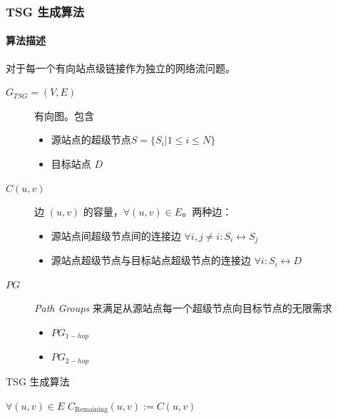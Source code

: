 \begin{frame}
    \frametitle{TSG 生成算法}
    \framesubtitle{算法描述}
    对于每一个有向站点级链接作为独立的网络流问题。
    \begin{description}
        \item[$G_{TSG}=(V,E)$] 有向图。包含
            \begin{itemize}
                \item 源站点的超级节点$S=\{S_i|1\leq i\leq N\}$
                \item 目标站点 $D$
            \end{itemize}
        \item[$C(u,v)$] 边 $(u,v)$ 的容量，$\forall (u,v)\in E$。两种边：
            \begin{itemize}
                \item 源站点间超级节点间的连接边 $\forall i,j\neq i:S_i\leftrightarrow S_j$
                \item 源站点超级节点与目标站点超级节点的连接边 $\forall i: S_i\leftrightarrow D$
            \end{itemize}
        \item[$PG$] \emph{Path Groups} 来满足从源站点每一个超级节点向目标节点的无限需求
            \begin{itemize}
                \item $PG_{1-hop}$
                \item $PG_{2-hop}$
            \end{itemize}
    \end{description}
\end{frame}

\begin{frame}
    \begin{algorithm*}[H]
        \small
        \caption{TSG 生成算法}\label{alg:tsggen}
        $\forall (u,v)\in E$ $C_\text{Remaining}(u,v):=C(u,v)$\;
    \end{algorithm*}
\end{frame}


